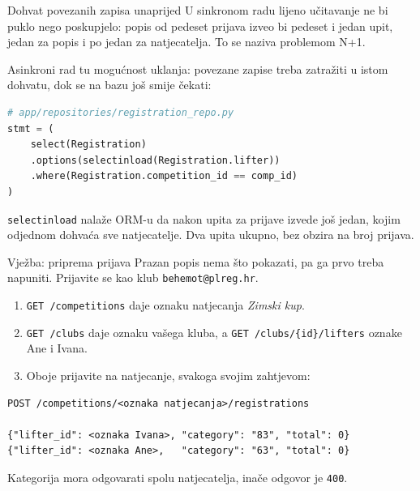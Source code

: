 \begin{frame}[fragile]{Dohvat povezanih zapisa unaprijed}
U sinkronom radu lijeno učitavanje ne bi puklo nego poskupjelo: popis od pedeset prijava izveo bi pedeset i jedan upit, jedan za popis i po jedan za natjecatelja. To se naziva problemom N+1.

\vspace{0.3em}
Asinkroni rad tu mogućnost uklanja: povezane zapise treba zatražiti u istom dohvatu, dok se na bazu još smije čekati:

\begin{lstlisting}[language=python]
# app/repositories/registration_repo.py
stmt = (
    select(Registration)
    .options(selectinload(Registration.lifter))
    .where(Registration.competition_id == comp_id)
)
\end{lstlisting}

\vspace{0.3em}
\texttt{selectinload} nalaže ORM-u da nakon upita za prijave izvede još jedan, kojim odjednom dohvaća sve natjecatelje. Dva upita ukupno, bez obzira na broj prijava.
\end{frame}

\begin{frame}[fragile]{Vježba: priprema prijava}
Prazan popis nema što pokazati, pa ga prvo treba napuniti. Prijavite se kao klub \texttt{behemot@plreg.hr}.

\vspace{0.8em}
\begin{enumerate}
  \itemsep0.5em
  \item \texttt{GET /competitions} daje oznaku natjecanja \emph{Zimski kup}.
  \item \texttt{GET /clubs} daje oznaku vašega kluba, a \texttt{GET /clubs/\{id\}/lifters} oznake Ane i Ivana.
  \item Oboje prijavite na natjecanje, svakoga svojim zahtjevom:
\end{enumerate}

\begin{lstlisting}
POST /competitions/<oznaka natjecanja>/registrations

{"lifter_id": <oznaka Ivana>, "category": "83", "total": 0}
{"lifter_id": <oznaka Ane>,   "category": "63", "total": 0}
\end{lstlisting}

\vspace{0.4em}
Kategorija mora odgovarati spolu natjecatelja, inače odgovor je \texttt{400}.
\end{frame}

